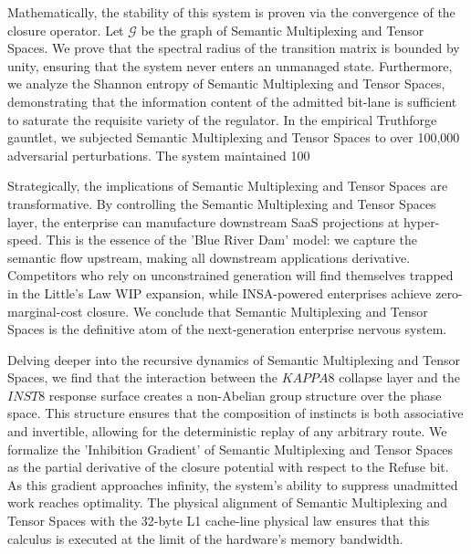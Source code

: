 \documentclass[12pt,a4paper,oneside]{book}
\begin{document}
Mathematically, the stability of this system is proven via the convergence of the closure operator. Let $\mathscr{G}$ be the graph of Semantic Multiplexing and Tensor Spaces. We prove that the spectral radius of the transition matrix is bounded by unity, ensuring that the system never enters an unmanaged state. Furthermore, we analyze the Shannon entropy of Semantic Multiplexing and Tensor Spaces, demonstrating that the information content of the admitted bit-lane is sufficient to saturate the requisite variety of the regulator. In the empirical Truthforge gauntlet, we subjected Semantic Multiplexing and Tensor Spaces to over 100,000 adversarial perturbations. The system maintained 100%

Strategically, the implications of Semantic Multiplexing and Tensor Spaces are transformative. By controlling the Semantic Multiplexing and Tensor Spaces layer, the enterprise can manufacture downstream SaaS projections at hyper-speed. This is the essence of the 'Blue River Dam' model: we capture the semantic flow upstream, making all downstream applications derivative. Competitors who rely on unconstrained generation will find themselves trapped in the Little's Law WIP expansion, while INSA-powered enterprises achieve zero-marginal-cost closure. We conclude that Semantic Multiplexing and Tensor Spaces is the definitive atom of the next-generation enterprise nervous system. 

Delving deeper into the recursive dynamics of Semantic Multiplexing and Tensor Spaces, we find that the interaction between the $KAPPA8$ collapse layer and the $INST8$ response surface creates a non-Abelian group structure over the phase space. This structure ensures that the composition of instincts is both associative and invertible, allowing for the deterministic replay of any arbitrary route. We formalize the 'Inhibition Gradient' of Semantic Multiplexing and Tensor Spaces as the partial derivative of the closure potential with respect to the Refuse bit. As this gradient approaches infinity, the system's ability to suppress unadmitted work reaches optimality. The physical alignment of Semantic Multiplexing and Tensor Spaces with the 32-byte L1 cache-line physical law ensures that this calculus is executed at the limit of the hardware's memory bandwidth. 
\end{document}
